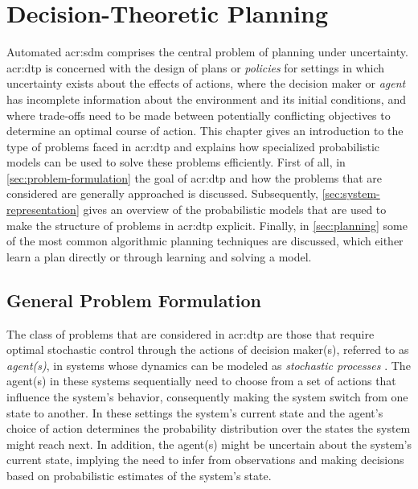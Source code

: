\chapter{Decision-Theoretic Planning}
\label{ch:background}
Automated \acrfull{acr:sdm} comprises the central problem of planning under uncertainty. 
\acrfull{acr:dtp} is concerned with the design of plans or \textit{policies} for settings in which uncertainty exists about the effects of actions, where the decision maker or \textit{agent} has incomplete information about the environment and its initial conditions, and where trade-offs need to be made between potentially conflicting objectives to determine an optimal course of action.
This chapter gives an introduction to the type of problems faced in \acrshort{acr:dtp} and explains how specialized probabilistic models can be used to solve these problems efficiently.
First of all, in \autoref{sec:problem-formulation} the goal of \acrshort{acr:dtp} and how the problems that are considered are generally approached is discussed.
Subsequently, \autoref{sec:system-representation} gives an overview of the probabilistic models that are used to make the structure of problems in \acrshort{acr:dtp} explicit.
Finally, in \autoref{sec:planning} some of the most common algorithmic planning techniques are discussed, which either learn a plan directly or through learning and solving a model.

\section{General Problem Formulation}
\label{sec:problem-formulation}

The class of problems that are considered in \acrlong{acr:dtp} are those that require optimal stochastic control through the actions of decision maker(s), referred to as \textit{agent(s)}, in systems whose dynamics can be modeled as \textit{stochastic processes} \cite{Boutilier1999}.
The agent(s) in these systems sequentially need to choose from a set of actions that influence the system's behavior, consequently making the system switch from one state to another.
In these settings the system's current state and the agent's choice of action determines the probability distribution over the states the system might reach next.
In addition, the agent(s) might be uncertain about the system's current state, implying the need to infer from observations and making decisions based on probabilistic estimates of the system's state.

